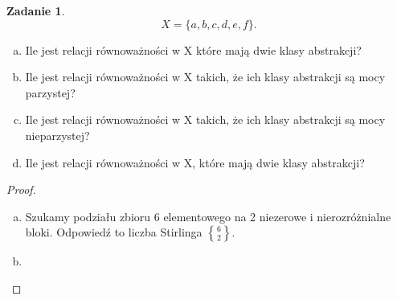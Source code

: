 \documentclass[11pt]{article}
\theoremstyle{definition}
\newtheorem{zadanie}{Zadanie}
\numberwithin{zadanie}{subsection}
\DeclareRobustCommand{\stirling}{\genfrac\{\}{0pt}{}}
\begin{document}
\begin{zadanie}

    $$X=\{a,b,c,d,e,f\}.$$

    \begin{enumerate}[a)]
        \item Ile jest relacji równoważności w X które mają dwie klasy abstrakcji?
        \item Ile jest relacji równoważności w X takich, że ich klasy abstrakcji są mocy parzystej?

        \item Ile jest relacji równoważności w X takich, że ich klasy abstrakcji są mocy nieparzystej?

        \item Ile jest relacji równoważności w X, które mają dwie klasy abstrakcji?
    \end{enumerate}
\end{zadanie}
\begin{proof}
    \begin{enumerate}[a)]
        \item Szukamy podziału zbioru 6 elementowego na 2 niezerowe i nierozróżnialne bloki. Odpowiedź to liczba Stirlinga $\stirling 62$.
        \item
    \end{enumerate}
\end{proof}






\end{document}
